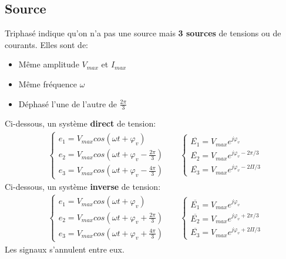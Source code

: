 \documentclass{report}
\begin{document}
\subsection{Source}
Triphasé indique qu'on n'a pas une source mais \textbf{3 sources} de tensions ou de courants. Elles sont de:
\begin{itemize}
\item Même amplitude $V_{max}$ et $I_{max}$
\item Même fréquence $\omega$
\item Déphasé l'une de l'autre de $\frac{2\pi}{3}$
\end{itemize}
Ci-dessous, un système \textbf{direct} de tension:
\begin{align*}
&\begin{cases}
e_1 = V_{max} cos(\omega t + \varphi_v)\\
e_2 = V_{max} cos(\omega t + \varphi_v - \frac{2\pi}{3})\\
e_3 = V_{max} cos(\omega t + \varphi_v - \frac{4 \pi}{3})
\end{cases} & &\begin{cases}
\overline{E_1} = V_{max}e^{j \varphi_v}\\
\overline{E_2} = V_{max}e^{j \varphi_v - 2 \pi /3}\\
\overline{E_3} = V_{max}e^{j \varphi_v - 2 \Pi /3}
\end{cases}
\end{align*}
Ci-dessous, un système \textbf{inverse} de tension:
\begin{align*}
&\begin{cases}
e_1 = V_{max} cos(\omega t + \varphi_v)\\
e_2 = V_{max} cos(\omega t + \varphi_v + \frac{2\pi}{3})\\
e_3 = V_{max} cos(\omega t + \varphi_v + \frac{4 \pi}{3})
\end{cases} & &\begin{cases}
\overline{E_1} = V_{max}e^{j \varphi_v}\\
\overline{E_2} = V_{max}e^{j \varphi_v + 2 \pi /3}\\
\overline{E_3} = V_{max}e^{j \varphi_v + 2 \Pi /3}
\end{cases}
\end{align*}
Les signaux s'annulent entre eux.
\end{document}
